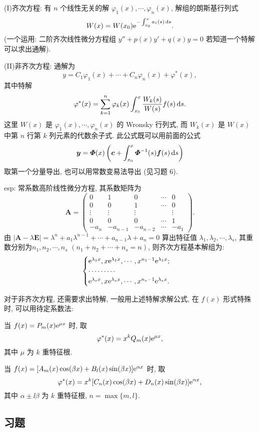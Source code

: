 (I)齐次方程: 有 $n$ 个线性无关的解 $\varphi_1(x),\cdots,\varphi_n(x)$, 解组的朗斯基行列式
\[W(x)=W(x_0)\mathrm{e}^{-\int_{x_0}^xa_1(s)\mathop{}\!\mathrm{d} s}.\]
(一个运用: 二阶齐次线性微分方程组 $y''+p(x)y'+q(x)y=0$ 若知道一个特解可以求出通解).

(II)非齐次方程: 通解为
\[y=C_1\varphi_1(x)+\cdots+C_n\varphi_n(x)+\varphi^*(x),\] 
其中特解
\[\varphi^*(x)=\sum_{k=1}^n\varphi_k(x)\int_{x_0}^x\frac{W_k(s)}{W(s)}f(s)\mathop{}\!\mathrm{d} s.\] 
这里 $W(x)$ 是 $\varphi_1(x),\cdots,\varphi_n(x)$
的 Wronsky 行列式, 而 $W_k(x)$ 是 $W(x)$ 中第 $n$ 行第 $k$ 列元素的代数余子式.
此公式既可以用前面的公式 
\[\bm{y}=\bm{\varPhi}(x)\left(\bm{c}+\int_{x_0}^x\bm{\varPhi}^{-1}(s)\bm{f}(s)\mathop{}\!\mathrm{d} s\right)\]
取第一个分量导出, 也可以用常数变易法导出 (见习题 6).

esp: 常系数高阶线性微分方程, 其系数矩阵为
\[\bm{A} = 
  \begin{pmatrix}
    0 & 1 & 0 & \cdots & 0 \\
    0 & 0 & 1 & \cdots & 0 \\
    \vdots&\vdots&\vdots&&\vdots \\
    0 & 0 & 0 & \cdots & 1 \\
    -a_n&-a_{n-1}&-a_{n-2}&\cdots&-a_1
  \end{pmatrix}.\]
由 $|\bm{A}-\lambda\bm{E}|=\lambda^n+a_1\lambda^{n-1}+\cdots+a_{n-1}\lambda+a_n=0$
算出特征值 $\lambda_1,\lambda_2,\cdots,\lambda_s$, 其重数分别为$n_1,n_2,\cdots,n_s$
$(n_1+n_2+\cdots+n_s=n)$, 则齐次方程基本解组为:
\[\begin{cases}
\mathrm{e}^{\lambda_1x},x\mathrm{e}^{\lambda_1x},\cdots,x^{n_1-1}\mathrm{e}^{\lambda_1x};\\
\cdots\cdots\cdots\\
\mathrm{e}^{\lambda_sx},x\mathrm{e}^{\lambda_sx},\cdots,x^{n_s-1}\mathrm{e}^{\lambda_sx}.
\end{cases}\]

对于非齐次方程, 还需要求出特解, 一般用上述特解求解公式, 在 $f(x)$ 形式特殊时, 可以用待定系数法:

当 $f(x)=P_m(x)\mathrm{e}^{\mu x}$ 时, 取
\[\varphi^*(x)=x^kQ_m(x)\mathrm{e}^{\mu x},\]
其中 $\mu$ 为 $k$ 重特征根.

当 $f(x)=[A_m(x)\cos(\beta x)+B_l(x)\sin(\beta x)]\mathrm{e}^{\alpha x}$ 时, 取
\[\varphi^*(x)=x^k[C_n(x)\cos(\beta x)+D_n(x)\sin(\beta x)]\mathrm{e}^{\alpha x},\]
其中 $\alpha\pm\ii\beta$ 为 $k$ 重特征根, $n=\max\{m,l\}$.



\subsection{习题}



